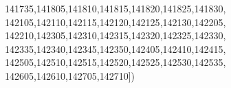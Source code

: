 \documentclass[
  12,
  dvipsnames]{article}
\newenvironment{Shaded}{\begin{snugshade}}{\end{snugshade}}
\newcommand{\NormalTok}[1]{#1}
\newcommand{\StringTok}[1]{\textcolor[rgb]{0.31,0.60,0.02}{#1}}
\begin{document}
\begin{Shaded}
\begin{Highlighting}[]
                  \StringTok{\textquotesingle{}141735\textquotesingle{}}\NormalTok{,}\StringTok{\textquotesingle{}141805\textquotesingle{}}\NormalTok{,}\StringTok{\textquotesingle{}141810\textquotesingle{}}\NormalTok{,}\StringTok{\textquotesingle{}141815\textquotesingle{}}\NormalTok{,}\StringTok{\textquotesingle{}141820\textquotesingle{}}\NormalTok{,}\StringTok{\textquotesingle{}141825\textquotesingle{}}\NormalTok{,}\StringTok{\textquotesingle{}141830\textquotesingle{}}\NormalTok{,}
                  \StringTok{\textquotesingle{}142105\textquotesingle{}}\NormalTok{,}\StringTok{\textquotesingle{}142110\textquotesingle{}}\NormalTok{,}\StringTok{\textquotesingle{}142115\textquotesingle{}}\NormalTok{,}\StringTok{\textquotesingle{}142120\textquotesingle{}}\NormalTok{,}\StringTok{\textquotesingle{}142125\textquotesingle{}}\NormalTok{,}\StringTok{\textquotesingle{}142130\textquotesingle{}}\NormalTok{,}\StringTok{\textquotesingle{}142205\textquotesingle{}}\NormalTok{,}
                  \StringTok{\textquotesingle{}142210\textquotesingle{}}\NormalTok{,}\StringTok{\textquotesingle{}142305\textquotesingle{}}\NormalTok{,}\StringTok{\textquotesingle{}142310\textquotesingle{}}\NormalTok{,}\StringTok{\textquotesingle{}142315\textquotesingle{}}\NormalTok{,}\StringTok{\textquotesingle{}142320\textquotesingle{}}\NormalTok{,}\StringTok{\textquotesingle{}142325\textquotesingle{}}\NormalTok{,}\StringTok{\textquotesingle{}142330\textquotesingle{}}\NormalTok{,}
                  \StringTok{\textquotesingle{}142335\textquotesingle{}}\NormalTok{,}\StringTok{\textquotesingle{}142340\textquotesingle{}}\NormalTok{,}\StringTok{\textquotesingle{}142345\textquotesingle{}}\NormalTok{,}\StringTok{\textquotesingle{}142350\textquotesingle{}}\NormalTok{,}\StringTok{\textquotesingle{}142405\textquotesingle{}}\NormalTok{,}\StringTok{\textquotesingle{}142410\textquotesingle{}}\NormalTok{,}\StringTok{\textquotesingle{}142415\textquotesingle{}}\NormalTok{,}
                  \StringTok{\textquotesingle{}142505\textquotesingle{}}\NormalTok{,}\StringTok{\textquotesingle{}142510\textquotesingle{}}\NormalTok{,}\StringTok{\textquotesingle{}142515\textquotesingle{}}\NormalTok{,}\StringTok{\textquotesingle{}142520\textquotesingle{}}\NormalTok{,}\StringTok{\textquotesingle{}142525\textquotesingle{}}\NormalTok{,}\StringTok{\textquotesingle{}142530\textquotesingle{}}\NormalTok{,}\StringTok{\textquotesingle{}142535\textquotesingle{}}\NormalTok{,}
                  \StringTok{\textquotesingle{}142605\textquotesingle{}}\NormalTok{,}\StringTok{\textquotesingle{}142610\textquotesingle{}}\NormalTok{,}\StringTok{\textquotesingle{}142705\textquotesingle{}}\NormalTok{,}\StringTok{\textquotesingle{}142710\textquotesingle{}}\NormalTok{])}


\end{Highlighting}
\end{Shaded}
\end{document}
